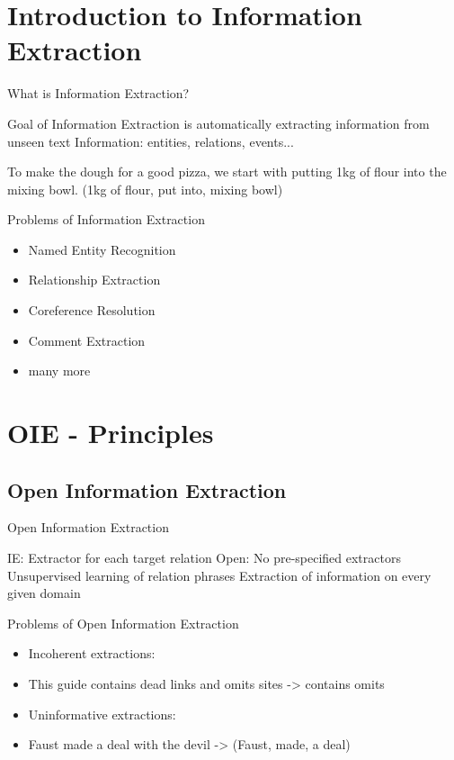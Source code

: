 \documentclass[11pt]{beamer}
\begin{document}
\section{Introduction to Information Extraction}
	\begin{frame}{What is Information Extraction?}
			\begin{center}
				Goal of Information Extraction is automatically extracting information from unseen text
				Information: entities, relations, events...
				
				To make the dough for a good pizza, we start with putting 1kg of flour into the mixing bowl.
				(1kg of flour, put into, mixing bowl)
			\end{center}
	\end{frame}
	\begin{frame}{Problems of Information Extraction}
				\begin{center}
				\begin{itemize}
					\item Named Entity Recognition
					\item Relationship Extraction 
					\item Coreference Resolution
					\item Comment Extraction
					\item many more
					\end{itemize}
				\end{center}
	\end{frame}
\section{OIE - Principles}
	\subsection{Open Information Extraction}
		\begin{frame}{Open Information Extraction}
			\begin{center}
				\begin{itemize}
				IE: Extractor for each target relation
				Open: No pre-specified extractors
					Unsupervised learning of relation phrases
				Extraction of information on every given domain
				\end{itemize}
			\end{center}
		\end{frame}
		\begin{frame}{Problems of Open Information Extraction}
					\begin{center}
						\begin{itemize}
						\item Incoherent extractions:
							\item This guide contains dead links and omits sites -> contains omits
						\item Uninformative extractions:
							\item Faust made a deal with the devil -> (Faust, made, a deal)
							\end{itemize}
					\end{center}
				\end{frame}
\end{document}
